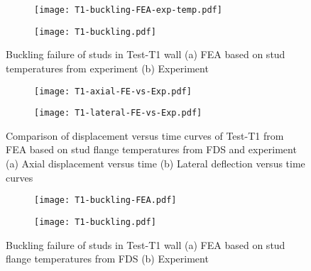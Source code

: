 \begin{figure}[!htbp]
	\centering
	\begin{subfigure}[b]{0.85\textwidth}
		\centering
		\texttt{[image: T1-buckling-FEA-exp-temp.pdf]}
		\caption{}
		\label{subfig:T1-buckling-FEA-exp-temp}
	\end{subfigure}
	\begin{subfigure}[b]{0.55\textwidth}
		\centering
		\texttt{[image: T1-buckling.pdf]}
		\caption{}
		\label{subfig:T1-buckling-FEA-Exp-exp-temp}
	\end{subfigure}
	   \caption{Buckling failure of studs in Test-T1 wall (a) FEA based on stud temperatures from experiment (b) Experiment}
	   \label{fig:T1-buckling-FE-vs-Exp-exp-temp}
\end{figure} 
\begin{figure}[!htbp]
	\centering
	\begin{subfigure}[b]{0.7\textwidth}
		\centering
		\texttt{[image: T1-axial-FE-vs-Exp.pdf]}
		\caption{}
		\label{subfig:T1-axial-FE-vs-Exp}
	\end{subfigure}
	\begin{subfigure}[b]{0.7\textwidth}
		\centering
		\texttt{[image: T1-lateral-FE-vs-Exp.pdf]}
		\caption{}
		\label{subfig:T1-lateral-FE-vs-Exp}
	\end{subfigure}
	   \caption{Comparison of displacement versus time curves of Test-T1 from FEA based on stud flange temperatures from FDS and experiment (a) Axial displacement versus time (b) Lateral deflection versus time curves}
	   \label{fig:T1-structural-FE-vs-Exp-exp-temp-disp}
\end{figure} 
\begin{figure}[!htbp]
	\centering
	\begin{subfigure}[b]{0.85\textwidth}
		\centering
		\texttt{[image: T1-buckling-FEA.pdf]}
		\caption{}
		\label{subfig:T1-buckling-FEA}
	\end{subfigure}
	\begin{subfigure}[b]{0.55\textwidth}
		\centering
		\texttt{[image: T1-buckling.pdf]}
		\caption{}
		\label{subfig:T1-buckling-FEA-Exp}
	\end{subfigure}
	   \caption{Buckling failure of studs in Test-T1 wall (a) FEA based on stud flange temperatures from FDS (b) Experiment}
	   \label{fig:T1-buckling-FE-vs-Exp}
\end{figure} 

